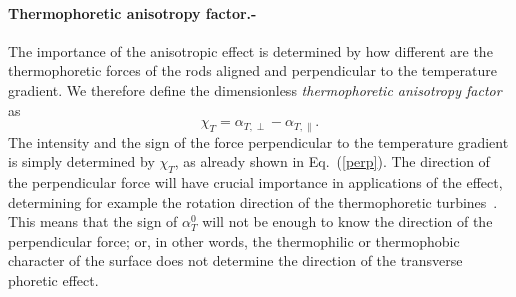 \documentclass[aps,pre,twocolumn,showpacs,superscriptaddress]{revtex4-1}
\begin{document}
\paragraph{Thermophoretic anisotropy factor.-}
The importance of the anisotropic effect is determined by how
different are the thermophoretic forces of the rods aligned and
perpendicular to the temperature gradient. We therefore define the
dimensionless {\em thermophoretic anisotropy factor} as
\begin{equation}
  \chi_T = \alpha_{T,\perp}- \alpha_{T,\|}.
\label{chi}
\end{equation}
The intensity and the sign of the force perpendicular to the
temperature gradient is simply determined by $\chi_T$, as
already shown in Eq.~(\ref{perp}). The direction of the perpendicular
force will have crucial importance in applications of the effect,
determining for example the rotation direction of the thermophoretic
turbines~\cite{yang14turb}.  %
This means that the sign of $\alpha_T^0$ will not be enough to know
the direction of the perpendicular force; or, in other words, the
thermophilic or thermophobic character of the surface does not
determine the direction of the transverse phoretic effect. %
\end{document}
